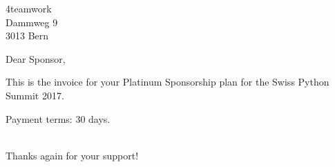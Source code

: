 \documentclass[SN,11pt,enlargefirstpage=true,sps]{scrlttr2}
\begin{document}
\begin{letter}{4teamwork\\Dammweg 9\\3013 Bern}

  \opening{Dear Sponsor,}

  This is the invoice for your Platinum Sponsorship plan for the Swiss Python Summit 2017.

  \begin{invoice}{0}%
  \end{invoice}

  Payment terms: 30 days.

  \closing{\\Thanks again for your support!}

\end{letter}
\end{document}
